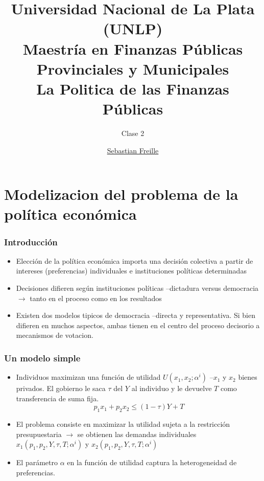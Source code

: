\documentclass[14pt,aspectratio=169]{beamer}
\title{Universidad Nacional de La Plata (UNLP) \\ Maestría en Finanzas
  Públicas Provinciales y Municipales \\ La Politica de las Finanzas
  Públicas}
\subtitle{Clase 2}
\author{\underline{Sebastian Freille} \inst{1}}
\institute[IEF (FCE-UNC)]{\inst{1} Instituto de Economía y Finanzas (FCE-UNC)}
\date{}
\begin{document}
\maketitle


\section{Modelizacion del problema de la política económica}


  \begin{frame}\frametitle{Introducción}
    \begin{itemize}\itemsep 10pt
    \item Elección de la política económica importa una decisión
      colectiva a partir de intereses (preferencias) individuales e
      instituciones políticas determinadas
      \item Decisiones difieren según instituciones políticas
        --dictadura versus democracia $\longrightarrow$ tanto en el
        proceso como en los resultados
       \item Existen dos modelos tipicos de democracia --directa y
         representativa. Si bien difieren en muchos aspectos, ambas
         tienen en el centro del proceso decisorio a mecanismos de
         votacion. 
      \end{itemize}
    \end{frame}



    \begin{frame}\frametitle{Un modelo simple}
    \begin{itemize}\itemsep 10pt
    \item Individuos maximizan una función de utilidad
      $U(x_{1},x_{2};\alpha^{i})$ --$x_{1}$ y $x_{2}$ bienes
      privados. El gobierno le saca $\tau$ del $Y$ al individuo y le
      devuelve $T$ como transferencia de suma fija.
      \begin{equation*}
        p_{1}x_{1}+p_{2}x_{2} \leq (1-\tau)Y+T
      \end{equation*}
      \item El problema consiste en maximizar la utilidad sujeta a la
        restricción presupuestaria $\longrightarrow$ se obtienen las
        demandas individuales $x_{1}(p_{1},p_{2},Y,\tau,T;\alpha^{i})$
        y $x_{2}(p_{1},p_{2},Y,\tau,T;\alpha^{i})$
        \item El parámetro $\alpha$ en la función de utilidad captura
          la heterogeneidad de preferencias.
      \end{itemize}
    \end{frame}
\end{document}
